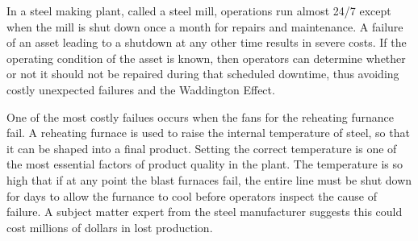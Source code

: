 In a steel making plant, called a steel mill, operations run almost 24/7 except when the mill is shut down once a month for repairs and maintenance.
A failure of an asset leading to a shutdown at any other time results in severe costs.
If the operating condition of the asset is known, then operators can determine whether or not it should not be repaired during that scheduled downtime,
thus avoiding costly unexpected failures and the Waddington Effect.


One of the most costly failues occurs when the fans for the reheating furnance fail.
A reheating furnace is used to raise the internal temperature of steel, so that it can be shaped into a final product.
Setting the correct temperature is one of the most essential factors of product quality in the plant.
The temperature is so high that if at any point the blast furnaces fail, the entire line must be shut down for days to allow the furnance to cool before operators inspect the cause of failure.
A subject matter expert from the steel manufacturer suggests this could cost millions of dollars in lost production.



